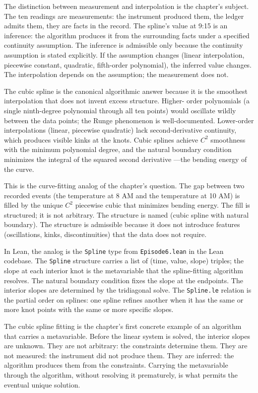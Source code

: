 The distinction between measurement and interpolation is the chapter's
subject. The ten readings are measurements: the instrument produced
them, the ledger admits them, they are facts in the record. The
spline's value at 9:15 is an inference: the algorithm produces it from
the surrounding facts under a specified continuity assumption. The
inference is admissible only because the continuity assumption is
stated explicitly. If the assumption changes (linear interpolation,
piecewise constant, quadratic, fifth-order polynomial), the inferred
value changes. The interpolation depends on the assumption; the
measurement does not.

The cubic spline is the canonical algorithmic answer because it is the
smoothest interpolation that does not invent excess structure. Higher-
order polynomials (a single ninth-degree polynomial through all ten
points) would oscillate wildly between the data points; the Runge
phenomenon is well-documented. Lower-order interpolations (linear,
piecewise quadratic) lack second-derivative continuity, which produces
visible kinks at the knots. Cubic splines achieve $C^2$ smoothness
with the minimum polynomial degree, and the natural boundary condition
minimizes the integral of the squared second derivative ---the bending
energy of the curve.

This is the curve-fitting analog of the chapter's question. The gap
between two recorded events (the temperature at 8 AM and the
temperature at 10 AM) is filled by the unique $C^2$ piecewise cubic
that minimizes bending energy. The fill is structured; it is not
arbitrary. The structure is named (cubic spline with natural boundary).
The structure is admissible because it does not introduce features
(oscillations, kinks, discontinuities) that the data does not
require.

In Lean, the analog is the \texttt{Spline} type from \texttt{Episode6.lean}
in the Lean codebase. The \texttt{Spline} structure carries a list of
(time, value, slope) triples; the slope at each interior knot is the
metavariable that the spline-fitting algorithm resolves. The natural
boundary condition fixes the slope at the endpoints. The interior
slopes are determined by the tridiagonal solve. The \texttt{Spline.le}
relation is the partial order on splines: one spline refines another
when it has the same or more knot points with the same or more
specific slopes.

The cubic spline fitting is the chapter's first concrete example of an
algorithm that carries a metavariable. Before the linear system is
solved, the interior slopes are unknown. They are not arbitrary: the
constraints determine them. They are not measured: the instrument did
not produce them. They are inferred: the algorithm produces them from
the constraints. Carrying the metavariable through the algorithm,
without resolving it prematurely, is what permits the eventual unique
solution.

